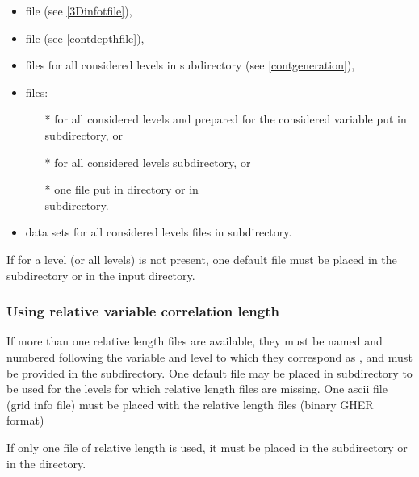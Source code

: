 \begin{itemize}
\item {} file (see \ref{3Dinfotfile}),
\item {} file (see \ref{contdepthfile}),
\item {} files for all considered levels in  subdirectory (see \ref{contgeneration}),
\item {} files:
\begin{itemize}
\item[*]  for all considered levels and prepared for the considered variable put in  subdirectory, or
\item[*]  for all considered levels  subdirectory, or
\item[*] one  file put in   directory or in\\ 
 subdirectory.
\end{itemize}
\item data sets for all considered levels  files in   subdirectory.
\end{itemize}


\btips
 If for a level (or all levels)  is not present, one default   file must be placed in the  subdirectory or in the input directory.
\etips

\subsubsection{Using relative variable correlation length}

If more than one relative length files are available, they must be  named and numbered following the variable and level to which they correspond as , and must be provided in the  subdirectory. One default file  may be placed in  subdirectory to be used for the levels for which relative length files are missing. One  ascii file (grid info file) must be placed with the relative length files (binary GHER format)

If only one  file of relative length is used, it must be placed in  the  subdirectory or in the  directory.

